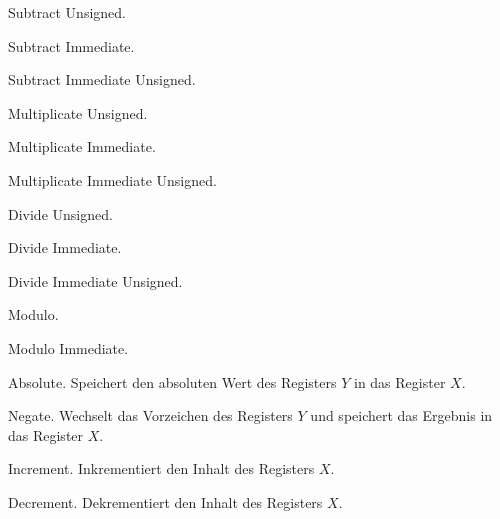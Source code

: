 

\glqq Subtract Unsigned\grqq.


\glqq Subtract Immediate\grqq.


\glqq Subtract Immediate Unsigned\grqq.






\glqq Multiplicate Unsigned\grqq.



\glqq Multiplicate Immediate\grqq.



\glqq Multiplicate Immediate Unsigned\grqq.







\glqq Divide Unsigned\grqq.



\glqq Divide Immediate\grqq.



\glqq Divide Immediate Unsigned\grqq.



Modulo.


Modulo Immediate.



\glqq Absolute\grqq.
Speichert den absoluten Wert des Registers $Y$ in das Register $X$.



\glqq Negate\grqq.
Wechselt das Vorzeichen des Registers $Y$ und speichert das Ergebnis in das 
Register $X$.



\glqq Increment\grqq.
Inkrementiert den Inhalt des Registers $X$.



\glqq Decrement\grqq.
Dekrementiert den Inhalt des Registers $X$.






